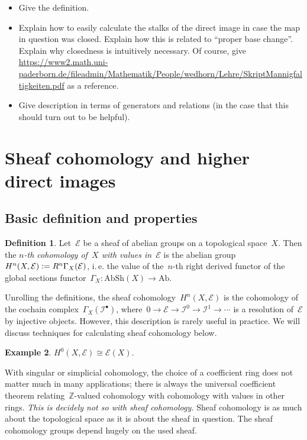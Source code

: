 \documentclass[10pt]{amsart}
\makeatletter
\theoremstyle{definition}
\newtheorem{defn}{Definition}[section]
\newtheorem{ex}[defn]{Example}
\theoremstyle{plain}
\theoremstyle{remark}
\newcommand{\E}{\mathcal{E}}
\newcommand{\I}{\mathcal{I}}
\newcommand{\Z}{\mathbb{Z}}
\newcommand{\Ab}{\mathrm{Ab}}
\newcommand{\AbSh}{\mathrm{AbSh}}
\newcommand{\defeq}{\vcentcolon=}
\newcommand{\ie}{i.\,e.\@\xspace}
\makeatother
\begin{document}
\begin{itemize}
\item Give the definition.
\item Explain how to easily calculate the stalks of the direct image in case
the map in question was closed. Explain how this is related to ``proper base
change''. Explain why closedness is intuitively necessary. Of course, give
\url{https://www2.math.uni-paderborn.de/fileadmin/Mathematik/People/wedhorn/Lehre/SkriptMannigfaltigkeiten.pdf}
as a reference.
\item Give description in terms of generators and relations (in the case that
this should turn out to be helpful).
\end{itemize}


\section{Sheaf cohomology and higher direct images}

\subsection{Basic definition and properties}

\begin{defn}Let~$\E$ be a sheaf of abelian groups on a topological space~$X$.
Then the \emph{$n$-th cohomology of~$X$ with values in~$\E$} is the abelian
group $H^n(X, \E) \defeq R^n\Gamma_X(\E)$, \ie the value of the~$n$-th right
derived functor of the global sections functor~$\Gamma_X : \AbSh(X) \to \Ab$.
\end{defn}

Unrolling the definitions, the sheaf cohomology~$H^n(X,\E)$ is the cohomology
of the cochain complex~$\Gamma_X(\I^\bullet)$, where~$0 \to \E \to \I^0 \to \I^1
\to \cdots$ is a resolution of~$\E$ by injective objects. However, this
description is rarely useful in practice. We will discuss techniques for
calculating sheaf cohomology below.

\begin{ex}$H^0(X,\E) \cong \E(X)$.\end{ex}

With singular or simplicial cohomology, the choice of a coefficient ring does
not matter much in many applications; there is always the universal coefficient
theorem relating~$\Z$-valued cohomology with cohomology with values in other
rings. \emph{This is decidely not so with sheaf cohomology.} Sheaf cohomology
is as much about the topological space as it is about the sheaf in question.
The sheaf cohomology groups depend hugely on the used sheaf.
\end{document}
